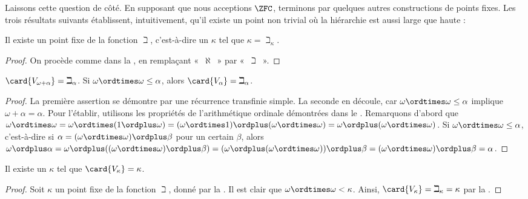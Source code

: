 \documentclass[../../../include/open-logic-section]{subfiles}
\begin{document}
Laissons cette question de côté. En supposant
que nous acceptions $\ZFC$, terminons par
quelques autres constructions de points fixes.
Les trois résultats suivants établissent,
intuitivement, qu'il existe un point non trivial
où la hiérarchie est aussi large que haute :

\begin{prop}
Il existe un point fixe de la fonction
$\beth$, c'est-à-dire un $\kappa$ tel que
$\kappa = \beth_\kappa$.
\end{prop}

\begin{proof}
On procède comme dans la ,
en remplaçant «~$\aleph$~» par
«~$\beth$~».
\end{proof}

\begin{prop}
$\card{V_{\omega+\alpha}} = \beth_{\alpha}$.
Si $\omega \ordtimes \omega \leq \alpha$,
alors $\card{V_\alpha} = \beth_\alpha$.
\end{prop}

\begin{proof}
La première assertion se démontre par une
récurrence transfinie simple. La seconde
en découle, car
$\omega \ordtimes \omega \leq \alpha$
implique $\omega + \alpha = \alpha$.
Pour l'établir, utilisons les propriétés
de l'arithmétique ordinale démontrées dans le
.
Remarquons d'abord que
$\omega \ordtimes \omega
= \omega \ordtimes (1 \ordplus \omega)
= (\omega \ordtimes 1)
\ordplus (\omega\ordtimes\omega)
= \omega \ordplus (\omega \ordtimes \omega)$.
Si $\omega \ordtimes \omega \leq \alpha$,
c'est-à-dire si
$\alpha = (\omega\ordtimes\omega)
\ordplus \beta$ pour un certain $\beta$,
alors
$\omega \ordplus \alpha
= \omega \ordplus
((\omega \ordtimes \omega) \ordplus \beta)
= (\omega \ordplus (\omega
\ordtimes \omega)) \ordplus \beta
= (\omega \ordtimes \omega)
\ordplus \beta = \alpha$.
\end{proof}

\begin{cor}
Il existe un $\kappa$ tel que
$\card{V_\kappa} = \kappa$.
\end{cor}

\begin{proof}
Soit $\kappa$ un point fixe de la fonction
$\beth$, donné par la .
Il est clair que
$\omega \ordtimes \omega < \kappa$.
Ainsi,
$\card{V_\kappa}
= \beth_\kappa = \kappa$
par la .
\end{proof}
\end{document}
